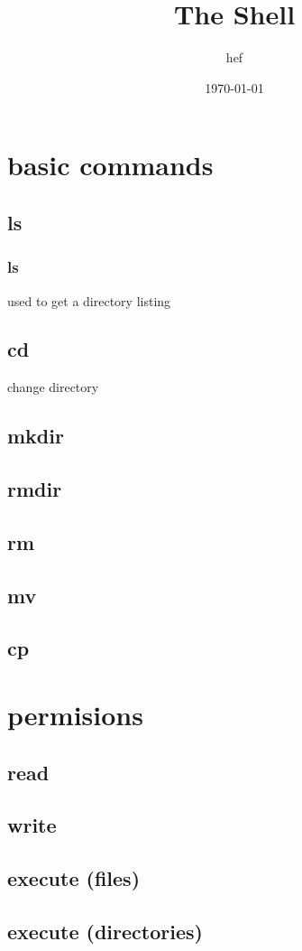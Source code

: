 \documentclass[hyperref={pdfpagelabels=false}]{beamer}
\title{The Shell}
\author{hef}
\date{\today}
\begin{document}
\frame{\titlepage}
\section[outline]{}
\frame{\tableofcontents}
\section{basic commands}
\subsection{ls}
\frame
{
	\frametitle{ls}
	used to get a directory listing
}
\subsection{cd}
\frame
{
	change directory
}
\subsection{mkdir}
\subsection{rmdir}
\subsection{rm}
\subsection{mv}
\subsection{cp}
\section{permisions}
\subsection{read}
\subsection{write}
\subsection{execute (files)}
\subsection{execute (directories)}
\end{document}
